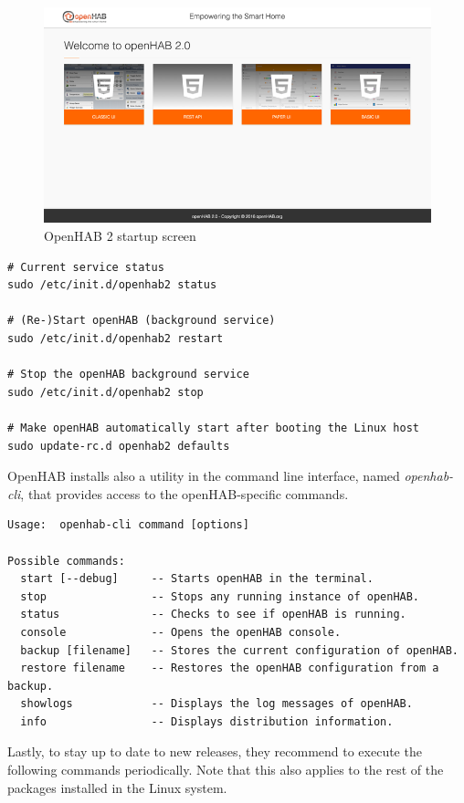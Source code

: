 \begin{figure}
    \centering
    \includegraphics[width=1\textwidth]{images/Chapter_06/openhab-startup.png}
    \caption{OpenHAB 2 startup screen}
    \label{fig:openhab-startup}
\end{figure}

\begin{lstlisting}[style=Consola]
# Current service status
sudo /etc/init.d/openhab2 status

# (Re-)Start openHAB (background service)
sudo /etc/init.d/openhab2 restart

# Stop the openHAB background service
sudo /etc/init.d/openhab2 stop

# Make openHAB automatically start after booting the Linux host
sudo update-rc.d openhab2 defaults
\end{lstlisting}

OpenHAB installs also a utility in the command line interface, named \textit{openhab-cli}, that provides access to the openHAB-specific
commands.

\begin{lstlisting}[style=Consola]
Usage:  openhab-cli command [options]

Possible commands:
  start [--debug]     -- Starts openHAB in the terminal.
  stop                -- Stops any running instance of openHAB.
  status              -- Checks to see if openHAB is running.
  console             -- Opens the openHAB console.
  backup [filename]   -- Stores the current configuration of openHAB.
  restore filename    -- Restores the openHAB configuration from a backup.
  showlogs            -- Displays the log messages of openHAB.
  info                -- Displays distribution information.
\end{lstlisting}

Lastly, to stay up to date to new releases, they recommend to execute the following commands periodically. Note that this also applies
to the rest of the packages installed in the Linux system.

